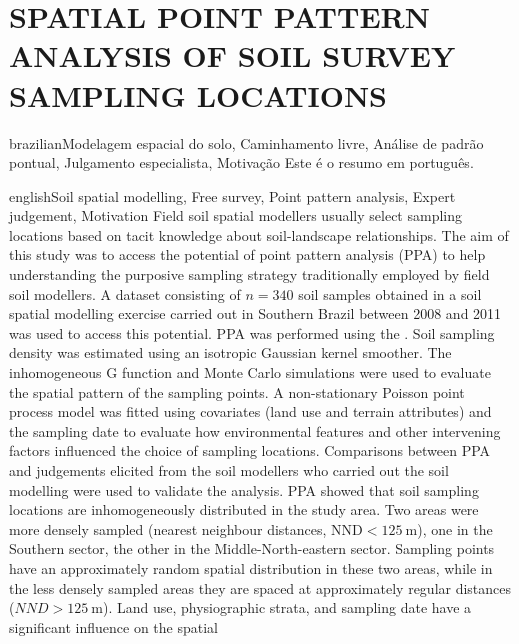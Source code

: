 \artigotrue
\chapter{SPATIAL POINT PATTERN ANALYSIS OF SOIL SURVEY SAMPLING LOCATIONS}
\label{chap:chap06}

\def\ptkeys{Modelagem espacial do solo, Caminhamento livre, Análise de padrão pontual, Julgamento 
especialista, Motivação}

\begin{chapterabstract}{brazilian}{\ptkeys}
Este é o resumo em português.
\end{chapterabstract}

\def\enkeys{Soil spatial modelling, Free survey, Point pattern analysis, Expert judgement, Motivation}
  
\begin{chapterabstract}{english}{\enkeys}
Field soil spatial modellers usually select sampling locations based on tacit knowledge about soil-landscape 
relationships. The aim of this study was to access the potential of point pattern analysis (PPA) to help 
understanding the purposive sampling strategy traditionally employed by field soil modellers. A dataset 
consisting of $n = 340$ soil samples obtained in a soil spatial modelling exercise carried out in Southern 
Brazil between \num{2008} and \num{2011} was used to access this potential. PPA was performed using the 
. Soil sampling density was estimated using an isotropic Gaussian kernel smoother. The 
inhomogeneous G function and Monte Carlo simulations were used to evaluate the spatial pattern of the sampling 
points. A non-stationary Poisson point process model was fitted using covariates (land use and terrain 
attributes) and the sampling date to evaluate how environmental features and other intervening factors 
influenced the choice of sampling locations. Comparisons between PPA and judgements elicited from the 
soil modellers who carried out the soil modelling were used to validate the analysis. PPA showed that soil 
sampling locations are inhomogeneously distributed in the study area. Two areas were more densely sampled 
(nearest neighbour distances, $\text{NND} < \SI{125}{\m}$), one in the Southern sector, the other in the 
Middle-North-eastern sector. Sampling points have an approximately random spatial distribution in these two 
areas, while in the less densely sampled areas they are spaced at approximately regular distances ($NND 
> \SI{125}{\m}$). Land use, physiographic strata, and sampling date have a significant influence on the spatial

\end{chapterabstract}
